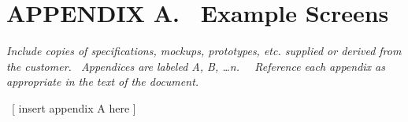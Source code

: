 \documentclass[twoside,letterpaper]{article}
\begin{document}
\clearpage\section[APPENDIX A. \ Example Screens]{\rmfamily\bfseries\color{black}
APPENDIX A. \ Example Screens}

\bigskip

{\itshape\color{black}
Include copies of specifications, mockups, prototypes, etc. supplied or
derived from the customer. \ Appendices are labeled A, B, {\dots}n.
\ \ Reference each appendix as appropriate in the text of the document.
}

{\color{black}
\foreignlanguage{english}{\ }\foreignlanguage{english}{[ insert appendix
A here ]}}

\bigskip
\end{document}
